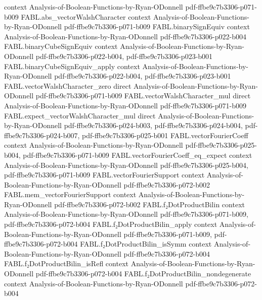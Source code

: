 \begin{theorem}
  {context}
  {Analysis-of-Boolean-Functions-by-Ryan-ODonnell}
  {pdf-ffbe9c7b3306-p071-b009}
\proofstep
  {FABL.abs_vectorWalshCharacter}
  {context}
  {Analysis-of-Boolean-Functions-by-Ryan-ODonnell}
  {pdf-ffbe9c7b3306-p071-b009}
\proofstep
  {FABL.binarySignEquiv}
  {context}
  {Analysis-of-Boolean-Functions-by-Ryan-ODonnell}
  {pdf-ffbe9c7b3306-p022-b004}
\proofstep
  {FABL.binaryCubeSignEquiv}
  {context}
  {Analysis-of-Boolean-Functions-by-Ryan-ODonnell}
  {pdf-ffbe9c7b3306-p022-b004,
    pdf-ffbe9c7b3306-p023-b001}
\proofstep
  {FABL.binaryCubeSignEquiv_apply}
  {context}
  {Analysis-of-Boolean-Functions-by-Ryan-ODonnell}
  {pdf-ffbe9c7b3306-p022-b004,
    pdf-ffbe9c7b3306-p023-b001}
\proofstep
  {FABL.vectorWalshCharacter_zero}
  {direct}
  {Analysis-of-Boolean-Functions-by-Ryan-ODonnell}
  {pdf-ffbe9c7b3306-p071-b009}
\proofstep
  {FABL.vectorWalshCharacter_mul}
  {direct}
  {Analysis-of-Boolean-Functions-by-Ryan-ODonnell}
  {pdf-ffbe9c7b3306-p071-b009}
\proofstep
  {FABL.expect_vectorWalshCharacter_mul}
  {direct}
  {Analysis-of-Boolean-Functions-by-Ryan-ODonnell}
  {pdf-ffbe9c7b3306-p024-b003,
    pdf-ffbe9c7b3306-p024-b004,
    pdf-ffbe9c7b3306-p024-b007,
    pdf-ffbe9c7b3306-p025-b001}
\proofstep
  {FABL.vectorFourierCoeff}
  {context}
  {Analysis-of-Boolean-Functions-by-Ryan-ODonnell}
  {pdf-ffbe9c7b3306-p025-b004,
    pdf-ffbe9c7b3306-p071-b009}
\proofstep
  {FABL.vectorFourierCoeff_eq_expect}
  {context}
  {Analysis-of-Boolean-Functions-by-Ryan-ODonnell}
  {pdf-ffbe9c7b3306-p025-b004,
    pdf-ffbe9c7b3306-p071-b009}
\proofstep
  {FABL.vectorFourierSupport}
  {context}
  {Analysis-of-Boolean-Functions-by-Ryan-ODonnell}
  {pdf-ffbe9c7b3306-p072-b002}
\proofstep
  {FABL.mem_vectorFourierSupport}
  {context}
  {Analysis-of-Boolean-Functions-by-Ryan-ODonnell}
  {pdf-ffbe9c7b3306-p072-b002}
\proofstep
  {FABL.f₂DotProductBilin}
  {context}
  {Analysis-of-Boolean-Functions-by-Ryan-ODonnell}
  {pdf-ffbe9c7b3306-p071-b009,
    pdf-ffbe9c7b3306-p072-b004}
\proofstep
  {FABL.f₂DotProductBilin_apply}
  {context}
  {Analysis-of-Boolean-Functions-by-Ryan-ODonnell}
  {pdf-ffbe9c7b3306-p071-b009,
    pdf-ffbe9c7b3306-p072-b004}
\proofstep
  {FABL.f₂DotProductBilin_isSymm}
  {context}
  {Analysis-of-Boolean-Functions-by-Ryan-ODonnell}
  {pdf-ffbe9c7b3306-p072-b004}
\proofstep
  {FABL.f₂DotProductBilin_isRefl}
  {context}
  {Analysis-of-Boolean-Functions-by-Ryan-ODonnell}
  {pdf-ffbe9c7b3306-p072-b004}
\proofstep
  {FABL.f₂DotProductBilin_nondegenerate}
  {context}
  {Analysis-of-Boolean-Functions-by-Ryan-ODonnell}
  {pdf-ffbe9c7b3306-p072-b004}
\proofstep

\end{theorem}
